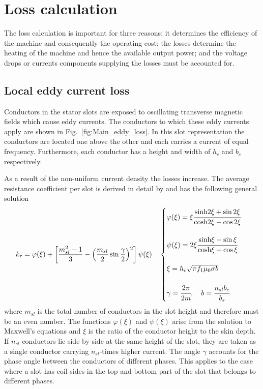 \section{Loss calculation}\label{sec:loss_calculations}
The loss calculation is important for three reasons: it determines the efficiency of the machine and consequently the operating cost; the losses determine the heating of the machine and hence the available output power; and the voltage drops or currents components supplying the losses must be accounted for. 

\subsection{Local eddy current loss}\label{subsec:skin_effect}
Conductors in the stator slots are exposed to oscillating transverse magnetic fields which cause eddy currents. The conductors to which these eddy currents apply are shown in Fig.~\ref{fig:Main_eddy_loss}. In this slot representation the conductors are located one above the other and each carries a current of equal frequency. Furthermore, each conductor has a height and width of $h_c$ and $b_c$ respectively. 

As a result of the non-uniform current density the losses increase. The average resistance coefficient per slot is derived in detail by \cite{lammeraner_1966} and has the following general solution
\begin{equation}
  \label{eqn:kr1}
  k_r = \varphi(\xi)+
  \left[
  \frac{m_{sl}^2-1}{3}-
  \left(\frac{m_{sl}}{2}\sin\frac{\gamma}{2}\right)^2
  \right]
  \psi(\xi) 
  \quad
  \begin{cases}
  \varphi(\xi)=\xi\cfrac%
  {\textnormal{sinh}2\xi+\sin 2\xi}
  {\textnormal{cosh}2\xi-\cos 2\xi}  \\
  \: \\
  \psi(\xi)=2\xi\cfrac
  {\textnormal{sinh}\xi-\sin \xi}
  {\textnormal{cosh}\xi+\cos \xi}  \\
  \: \\
  \xi = h_c \sqrt{\pi f_1 \mu_{0} \sigma b}\\ 
  \: \\
  \gamma = \cfrac{2\pi}{2m}, \quad b=\cfrac{n_{sl} b_c}{b_s}
  \end{cases}
\end{equation}
where $m_{sl}$ is the total number of conductors in the slot height and therefore must be an even number. The functions $\varphi(\xi)$ and $\psi(\xi)$ arise from the solution to Maxwell's equations and $\xi$ is the ratio of the conductor height to the skin depth. If $n_{sl}$ conductors lie side by side at the same height of the slot, they are taken as a single conductor carrying $n_{sl}$-times higher current. The angle $\gamma$ accounts for the phase angle between the conductors of different phases. This applies to the case where a slot has coil sides in the top and bottom part of the slot that belongs to different phases.


